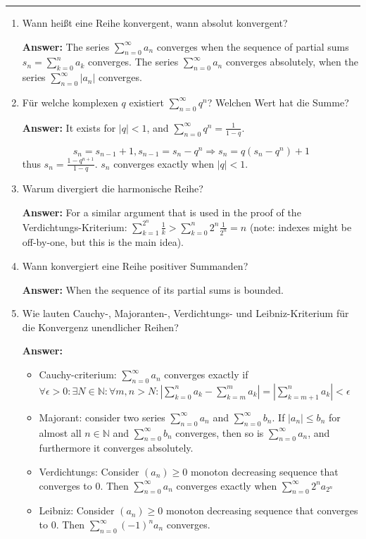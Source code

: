 \documentclass[11pt]{article}
\newcommand{\abs}[1]{\left|#1\right|}
\newcommand{\sumn}[4]{\sum_{#1=#2}^{#3}{#4}}
\begin{document}




\medskip\hrule
\begin{enumerate}
    \item Wann heißt eine Reihe konvergent, wann absolut konvergent?
    
    \textbf{Answer:} The series $\sumn{n}{0}{\infty}{a_n}$ converges when the sequence of partial sums $s_n = \sumn{k}{0}{n}{a_k}$ converges. The series $\sumn{n}{0}{\infty}{a_n}$ converges absolutely, when the series $\sumn{n}{0}{\infty}{\abs{a_n}}$ converges.

    \item  Für welche komplexen $q$ existiert $\sum_{n=0}^\infty {q^n}$? Welchen Wert hat die Summe?
    
    \textbf{Answer:} It exists for $\abs{q} < 1$, and $\sum_{n=0}^\infty {q^n} = \frac{1}{1-q}$. 
    
    $$s_n = s_{n-1} + 1, s_{n-1} = s_n - q^n \Rightarrow s_n = q(s_n - q^n)+1$$
    thus $s_n = \frac{1-q^{n+1}}{1-q}$. $s_n$ converges exactly when $\abs{q} < 1$.

    \item  Warum divergiert die harmonische Reihe?
    
    \textbf{Answer:} For a similar argument that is used in the proof of the Verdichtungs-Kriterium: $\sumn{k}{1}{2^n}{\frac{1}{k}} > \sumn{k}{0}{n}{2^n \frac{1}{2^n}} = n$ (note: indexes might be off-by-one, but this is the main idea).

    \item  Wann konvergiert eine Reihe positiver Summanden?
    
    \textbf{Answer:} When the sequence of its partial sums is bounded.

    \item  Wie lauten Cauchy-, Majoranten-, Verdichtungs- und Leibniz-Kriterium für die Konvergenz unendlicher Reihen?
    
    \textbf{Answer:} \begin{itemize}
        \item Cauchy-criterium: $\sumn{n}{0}{\infty}{a_n}$ converges exactly if $\forall \epsilon > 0\colon  \exists N \in \mathbb{N}\colon \forall m,n > N\colon \abs{\sumn{k}{0}{n}{a_k} - \sumn{k}{m}{m}{a_k}} = \abs{\sumn{k}{m+1}{n}{a_k}} < \epsilon$
        \item Majorant: consider two series $\sumn{n}{0}{\infty}{a_n}$ and $\sumn{n}{0}{\infty}{b_n}$. If $\abs{a_n} \le b_n$ for almost all $n\in \mathbb{N}$ and $\sumn{n}{0}{\infty}{b_n}$ converges, then so is $\sumn{n}{0}{\infty}{a_n}$, and furthermore it converges absolutely.
        \item Verdichtungs: Consider $(a_n) \ge 0$ monoton decreasing sequence that converges to $0$. Then $\sumn{n}{0}{\infty}{a_n}$ converges exactly when $\sumn{n}{0}{\infty}{2^n a_{2^n}}$
        \item Leibniz: Consider $(a_n) \ge 0$ monoton decreasing sequence that converges to $0$. Then $\sumn{n}{0}{\infty}{(-1)^n a_n}$ converges.
    \end{itemize}


\end{enumerate}
\end{document}
